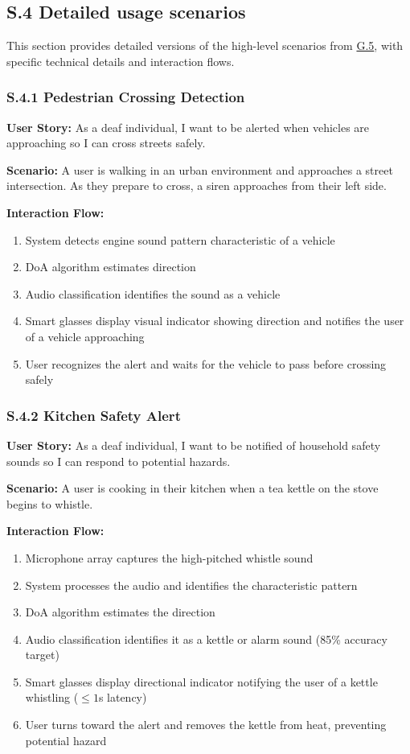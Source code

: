 \documentclass[12pt]{article}
\theoremstyle{definition}
\begin{document}
\subsection{S.4 Detailed usage scenarios}

This section provides detailed versions of the high-level scenarios from
\hyperref[item: G.5]{G.5}, with specific technical details and interaction
flows.

\subsubsection{S.4.1 Pedestrian Crossing Detection}
\textbf{User Story:} As a deaf individual, I want to be alerted when vehicles
are approaching so I can cross streets safely.

\textbf{Scenario:} A user is walking in an urban environment and approaches a
street intersection. As they prepare to cross, a siren approaches from their left
side.

\textbf{Interaction Flow:}
\begin{enumerate}
    \item System detects engine sound pattern characteristic of a vehicle
    \item DoA algorithm estimates direction
    \item Audio classification identifies the sound as a vehicle
    \item Smart glasses display visual indicator showing direction and notifies
    the user of a vehicle approaching
    \item User recognizes the alert and waits for the vehicle to pass before
    crossing safely
\end{enumerate}

\subsubsection{S.4.2 Kitchen Safety Alert}
\textbf{User Story:} As a deaf individual, I want to be notified of household
safety sounds so I can respond to potential hazards.

\textbf{Scenario:} A user is cooking in their kitchen when a tea kettle on the
stove begins to whistle.

\textbf{Interaction Flow:}
\begin{enumerate}
    \item Microphone array captures the high-pitched whistle sound
    \item System processes the audio and identifies the characteristic pattern
    \item DoA algorithm estimates the direction
    \item Audio classification identifies it as a kettle or alarm sound (85\%
    accuracy target)
    \item Smart glasses display directional indicator notifying the user of a
    kettle whistling ($\leq 1$s latency)
    \item User turns toward the alert and removes the kettle from heat,
    preventing potential hazard
\end{enumerate}
\end{document}
